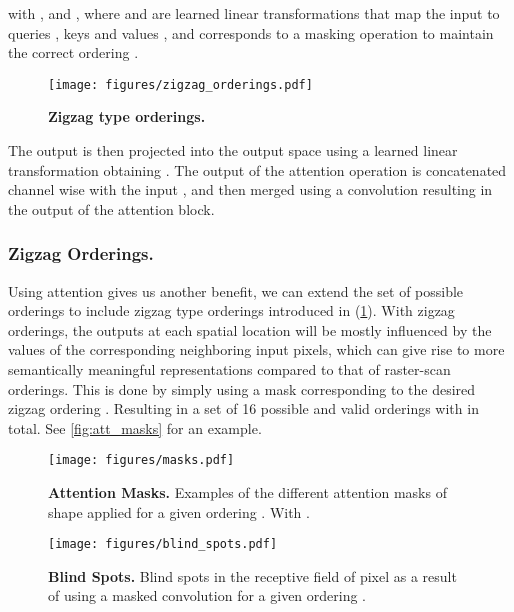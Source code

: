 with ,  and , where 
and 
are learned linear transformations that map the input  to queries , keys  and values , and
 corresponds to a masking operation
to maintain the correct ordering .

\begin{figure}[t]
\centering
\texttt{[image: figures/zigzag\_orderings.pdf]}
\vspace{-0.3in}
\caption{\textbf{Zigzag type orderings.}}
\label{fig:zigzag_orderings}
\vspace{-0.2in}
\end{figure}

The output is then projected into the output space using 
a learned linear transformation  obtaining .
The output of the attention operation  is concatenated channel wise
with the input , and then merged using a  convolution
resulting in the output of the attention block.




\vspace{-0.1in}
\subsubsection{Zigzag Orderings.} \label{zo}
Using attention gives us another benefit, we can extend the set of possible orderings to include
zigzag type orderings introduced in \cite{psnail} (\cref{fig:zigzag_orderings}).
With zigzag orderings, the outputs at each spatial location will be mostly influenced
by the values of the corresponding
neighboring input pixels, which can give rise to more semantically meaningful representations compared
to that of raster-scan orderings. This is done by simply 
using a mask  corresponding to the desired zigzag ordering .
Resulting in a set  of 16 possible and valid orderings  with  in total.
See \cref{fig:att_masks} for an example.


\begin{figure}
    \centering
    \begin{minipage}{0.45\textwidth}
        \centering
        \texttt{[image: figures/masks.pdf]}
        \caption{\textbf{Attention Masks.} Examples of the different
          attention masks  of shape  applied for a given ordering . With .}
        \label{fig:att_masks}
    \end{minipage}\qquad
    \begin{minipage}{0.45\textwidth}
        \centering
        \texttt{[image: figures/blind\_spots.pdf]}
        \caption{\textbf{Blind Spots.} Blind spots in the receptive field of
        pixel \crule[orange]{0.2cm}{0.2cm} as a result of
        using a masked convolution for a given ordering .}
        \label{fig:blind_spots}
    \end{minipage}
\vspace{-0.1in}
\end{figure}


















